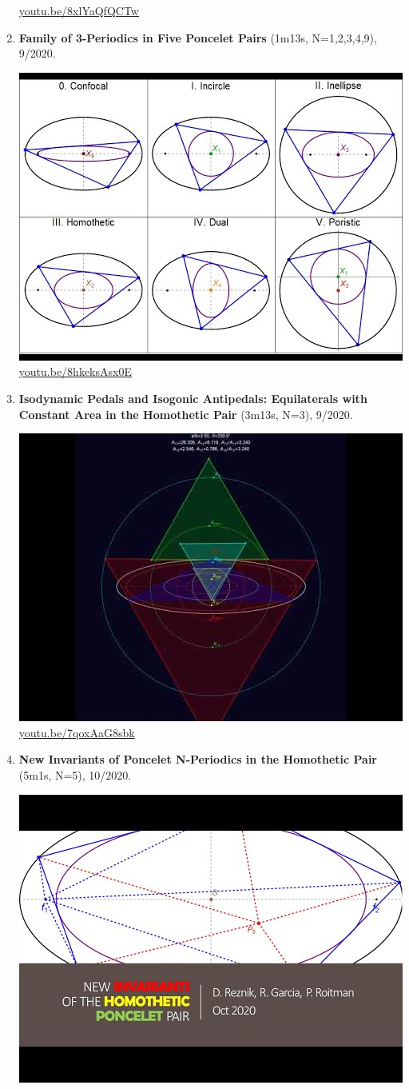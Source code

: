 \documentclass[12pt]{amsart}
\begin{document}
\begin{enumerate}[resume]
\begin{center}
\href{https://youtu.be/8xlYaQfQCTw}{\url{youtu.be/8xlYaQfQCTw}}\end{center}
% 
\item \textbf{Family of 3-Periodics in Five Poncelet Pairs} (1m13s, N=1,2,3,4,9), 9/2020. 
\begin{center}\includegraphics[width=.5\textwidth]{pics/8hkeksAsx0E.jpg} \\ 
\href{https://youtu.be/8hkeksAsx0E}{\url{youtu.be/8hkeksAsx0E}}\end{center}
% 
\item \textbf{Isodynamic Pedals and Isogonic Antipedals: Equilaterals with Constant Area in the Homothetic Pair} (3m13s, N=3), 9/2020. 
\begin{center}\includegraphics[width=.5\textwidth]{pics/7qoxAaG8sbk.jpg} \\ 
\href{https://youtu.be/7qoxAaG8sbk}{\url{youtu.be/7qoxAaG8sbk}}\end{center}
% 
\item \textbf{New Invariants of Poncelet N-Periodics in the Homothetic Pair} (5m1s, N=5), 10/2020. 
\begin{center}\includegraphics[width=.5\textwidth]{pics/2PdsC3CcqaE.jpg} \\ 

\end{center}
\end{enumerate}
\end{document}
